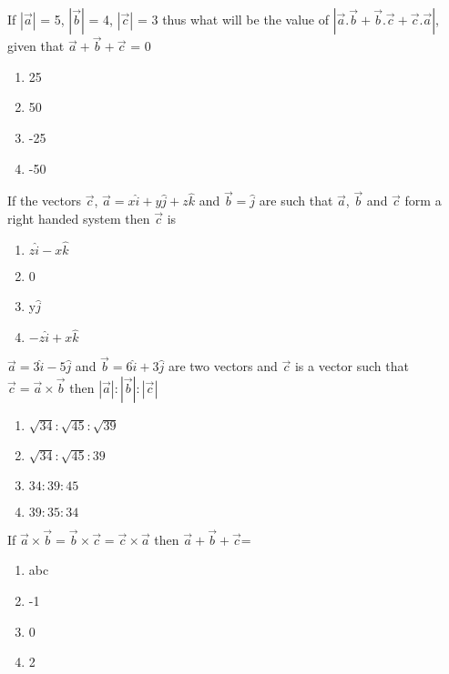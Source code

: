 \item If $|\overrightarrow{a}|$ = 5, $|\overrightarrow{b}|$ = 4, $|\overrightarrow{c}|$ = 3 thus what will be the value of 
$|\overrightarrow{a}.\overrightarrow{b} + \overrightarrow{b}.\overrightarrow{c} + \overrightarrow{c}.\overrightarrow{a}|$, given that $\overrightarrow{a} + \overrightarrow{b} + \overrightarrow{c}$ = 0
\begin{enumerate}
\item 25
\item 50
\item -25
\item -50
\end{enumerate}

\item If the vectors $\overrightarrow{c}$, $\overrightarrow{a} = x\hat{i} + y\hat{j} + z\hat{k}$ and $\overrightarrow{b} = \hat{j}$ are such that $\overrightarrow{a}$, $\overrightarrow{b}$ and $\overrightarrow{c}$ form a right handed system then $\overrightarrow{c}$ is
\begin{enumerate}
\item $z\hat{i} - x\hat{k}$
\item 0
\item y$\hat{j}$
\item $-z\hat{i} + x\hat{k}$
\end{enumerate}

\item $\overrightarrow{a}=3\hat{i}-5\hat{j}$ and $\overrightarrow{b}=6\hat{i}+3\hat{j}$ are two vectors and $\overrightarrow{c}$ is a vector such that $\overrightarrow{c}=\overrightarrow{a} \times \overrightarrow{b}$ then 
$|\overrightarrow{a}|:|\overrightarrow{b}|:|\overrightarrow{c}|$
\begin{enumerate}
\item $\sqrt{34}:\sqrt{45}:\sqrt{39}$
\item $\sqrt{34}:\sqrt{45}:39$
\item $34:39:45$
\item $39:35:34$
\end{enumerate}

\item If $\overrightarrow{a} \times \overrightarrow{b} = \overrightarrow{b} \times \overrightarrow{c} = \overrightarrow{c} \times \overrightarrow{a}$ then $\overrightarrow{a}+\overrightarrow{b}+\overrightarrow{c}$=
\begin{enumerate}
\item abc
\item -1
\item 0
\item 2
\end{enumerate}

